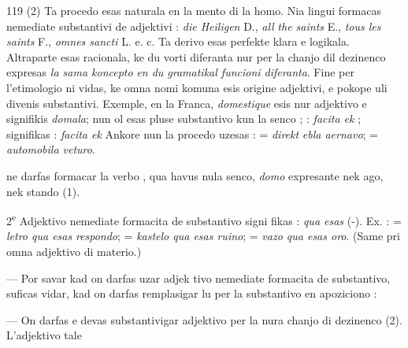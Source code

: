 \begin{VUpage}[123]{119}
{(2) Ta procedo esas naturala en la mento di la homo. Nia lingui\nl
formacas nemediate substantivi de adjektivi : \textit{die Heiligen} D., \textit{all}\nl
\textit{the saints} E., \textit{tous les saints} F., \textit{omnes sancti} L. e. c. Ta derivo esas\nl
perfekte klara e logikala. Altraparte esas racionala, ke du vorti\nl
diferanta nur per la chanjo dil dezinenco expresas \textit{la sama koncepto}\nl
\textit{en du gramatikal funcioni diferanta}. Fine per l'etimologio ni vidas,\nl
ke omna nomi komuna esis origine adjektivi, e pokope uli divenis\nl
substantivi. Exemple, en la Franca, \textit{domestique} esis nur adjektivo e\nl
signifikis \textit{domala}; nun ol esas pluse substantivo kun la senco\nl
{};   : \textit{facita ek} ;  signifikas :\nl
\textit{facita ek}  Ankore nun la procedo uzesas :  = \textit{direkt}\cc
\textit{ebla aernavo};  = \textit{automobila veturo}.%
}

\VUcontinue
ne darfas formacar la verbo , qua havus nula senco,\nl
\textit{domo} expresante nek ago, nek stando (1).

2\textsuperscript{e} Adjektivo nemediate formacita de substantivo signi\cc
fikas : \textit{qua esas} (-). Ex. :  = \textit{letro qua esas}\nl
\textit{respondo};  = \textit{kastelo qua esas ruino}; \nl
= \textit{vazo qua esas oro}. (Same pri omna adjektivo di materio.)\parplein

 --- Por savar kad on darfas uzar adjek\cc
tivo nemediate formacita de substantivo, suficas vidar, kad\nl
on darfas remplasigar lu per la substantivo en apoziciono :\nl
{}

 --- On darfas e devas substantivigar adjektivo\nl
per la nura chanjo di dezinenco (2). L'adjektivo tale\parplein
\end{VUpage}

